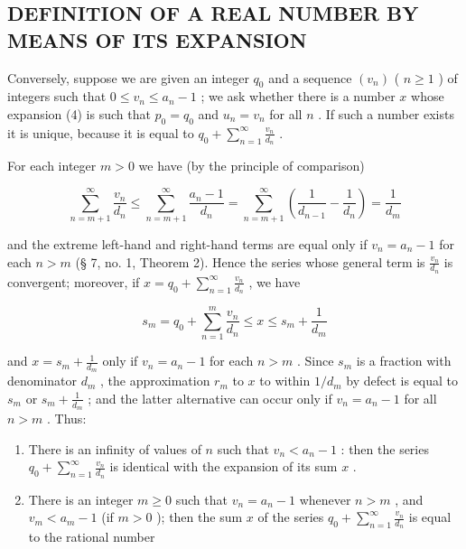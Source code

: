 \subsection{DEFINITION OF A REAL NUMBER BY MEANS OF ITS EXPANSION}

Conversely, suppose we are given an integer \(q_0\) and a sequence \((v_n)\) ( \(n \geqslant 1\) ) of integers such that \(0 \leqslant v_n \leqslant a_n - 1\) ; we ask whether there is a number \(x\) whose expansion (4) is such that \(p_0 = q_0\) and \(u_n = v_n\) for all \(n\) . If such a number exists it is unique, because it is equal to \(q_0 + \sum_{n=1}^{\infty} \frac{v_n}{d_n}\) .

For each integer \(m > 0\) we have (by the principle of comparison)

\[
\sum_ {n = m + 1} ^ {\infty} \frac {v _ {n}}{d _ {n}} \leqslant \sum_ {n = m + 1} ^ {\infty} \frac {a _ {n} - 1}{d _ {n}} = \sum_ {n = m + 1} ^ {\infty} \left(\frac {1}{d _ {n - 1}} - \frac {1}{d _ {n}}\right) = \frac {1}{d _ {m}}
\]

and the extreme left-hand and right-hand terms are equal only if \(v_{n} = a_{n} - 1\) for each \(n > m\) (§ 7, no. 1, Theorem 2). Hence the series whose general term is \(\frac{v_n}{d_n}\) is convergent; moreover, if \(x = q_0 + \sum_{n=1}^{\infty} \frac{v_n}{d_n}\) , we have

\[
s _ {m} = q _ {0} + \sum_ {n = 1} ^ {m} \frac {v _ {n}}{d _ {n}} \leqslant x \leqslant s _ {m} + \frac {1}{d _ {m}}
\]

and \(x = s_m + \frac{1}{d_m}\) only if \(v_n = a_n - 1\) for each \(n > m\) . Since \(s_m\) is a fraction with denominator \(d_m\) , the approximation \(r_m\) to \(x\) to within \(1/d_m\) by defect is equal to \(s_m\) or \(s_m + \frac{1}{d_m}\) ; and the latter alternative can occur only if \(v_{n} = a_{n} - 1\) for all \(n > m\) . Thus:

\begin{enumerate}
\def\labelenumi{(\roman{enumi})}
\item
  There is an infinity of values of \(n\) such that \(v_{n} < a_{n} - 1\) : then the series \(q_{0} + \sum_{n=1}^{\infty} \frac{v_{n}}{d_{n}}\) is identical with the expansion of its sum \(x\) .
\item
  There is an integer \(m \geqslant 0\) such that \(v_{n} = a_{n} - 1\) whenever \(n > m\) , and \(v_{m} < a_{m} - 1\) (if \(m > 0\) ); then the sum \(x\) of the series \(q_{0} + \sum_{n=1}^{\infty} \frac{v_{n}}{d_{n}}\) is equal to the rational number
\end{enumerate}

